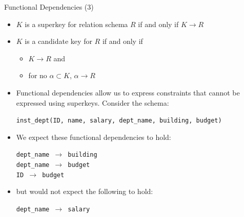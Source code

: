 \documentclass[aspectratio=169, xcolor=dvipsnames]{beamer}
\begin{document}
\begin{frame}{Functional Dependencies (3)}
    \begin{itemize}[<+->]
        \item $K$ is a superkey for relation schema $R$ if and only if $K \rightarrow R$
        \item $K$ is a candidate key for $R$ if and only if
        \begin{itemize}
            \item[$\triangleright$] $K \rightarrow R$ and
            \item[$\triangleright$] for no $\alpha \subset K$, $\alpha \rightarrow R$
        \end{itemize}
        \item Functional dependencies allow us to express constraints that cannot be expressed using superkeys. Consider the schema:
        \begin{center}
        \texttt{inst\_dept(ID, name, salary, dept\_name, building, budget)}
        \end{center}
        \item We expect these functional dependencies to hold:
        \begin{center}
        \texttt{dept\_name $\rightarrow$ building} \\
        \texttt{dept\_name $\rightarrow$ budget} \\
        \texttt{ID $\rightarrow$ budget}
        \end{center}
        \item but would not expect the following to hold:
        \begin{center}
        \texttt{dept\_name $\rightarrow$ salary}
        \end{center}
    \end{itemize}
\end{frame}
\end{document}
